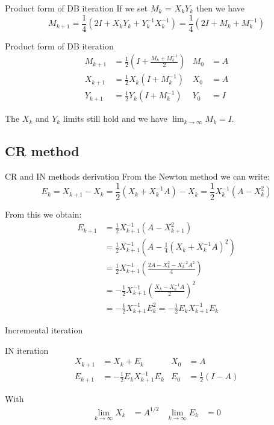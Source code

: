 \documentclass{beamer}
\theoremstyle{plain}
\theoremstyle{definition}
\theoremstyle{remark}
\newcommand{\pa}[1]{\left(#1\right)}
\begin{document}
\begin{frame}{Product form of DB iteration}
  If we set $M_k$ = $X_kY_k$ then we have
  \[ M_{k+1} = \frac{1}{4}\pa{2 I + X_kY_k + Y_k^{-1}X_k^{-1}} =
    \frac{1}{4}\pa{2I + M_k + M_k^{-1}} \]
  \begin{block}{Product form of DB iteration}
    \begin{align*}
      M_{k+1} &= \frac{1}{2}\pa{ I + \frac{M_k + M_k^{-1}}{2}} & M_0 &=
                                                                      A
      \\
      X_{k+1} &= \frac{1}{2} X_k\pa{I+M_k^{-1}} & X_0 &= A \\
      Y_{k+1} &= \frac{1}{2} Y_k\pa{I+M_k^{-1}} & Y_0 &= I
    \end{align*}
  \end{block}
  The $X_k$ and $Y_k$ limits still hold and we have $\lim _{k\to
    \infty} M_k = I$.
\end{frame}

\subsection{CR method}

\begin{frame}{CR and IN methods derivation}
  From the Newton method we can write:
  \[ E_{k} = X_{k+1} - X_k = \frac{1}{2}\pa{X_k + X_k^{-1}A} - X_k =
    \frac{1}{2} X_k^{-1} \pa{A-X_k^2} \]
  
  From this we obtain:
  \begin{align*}
    E_{k+1} &= \frac{1}{2}X_{k+1}^{-1}\pa{A-X_{k+1}^2} \\
    &= \frac{1}{2}X_{k+1}^{-1}\pa{A-\frac{1}{4}\pa{X_k +X_k^{-1}A}^2}
    \\
    &= \frac{1}{2}X_{k+1}^{-1}\pa{\frac{2A-X_k^2 -X_k^{-2}A^2}{4}} \\
    &= -\frac{1}{2}X_{k+1}^{-1}\pa{\frac{X_k - X_k^{-1}A}{2}}^2  \\
    &= -\frac{1}{2}X_{k+1}^{-1}E_k^2 = -\frac{1}{2}E_kX_{k+1}^{-1}E_k
  \end{align*}
\end{frame}

\begin{frame}{Incremental iteration}
  \begin{block}{IN iteration}
    \begin{align*}
      X_{k+1} &= X_k + E_k & X_0 &= A \\
      E_{k+1} &= -\frac{1}{2} E_k X_{k+1}^{-1} E_k & E_0
                                 &=\frac{1}{2}\pa{I-A}
    \end{align*}
  \end{block}
  With 
  \begin{align*}
    \lim _{k\to \infty} X_k & = A^{1/2} & \lim _{k\to \infty} E_k &=0
  \end{align*}
\end{frame}
\end{document}
